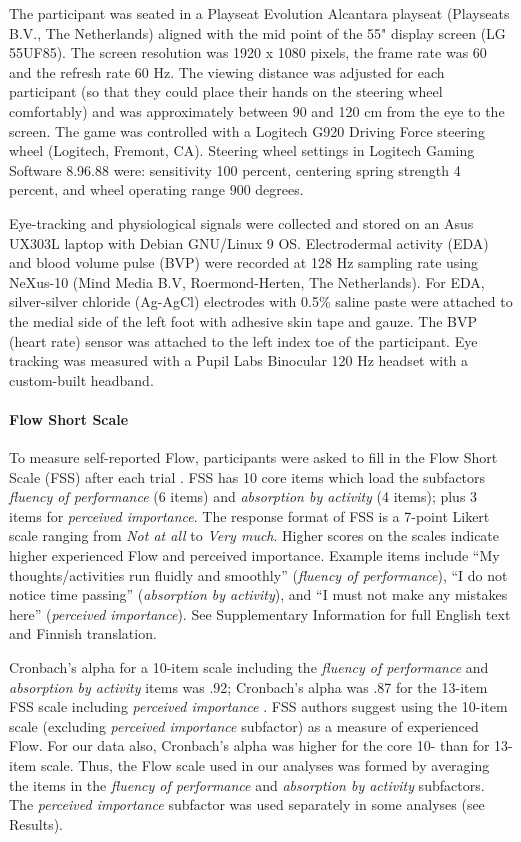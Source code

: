 \documentclass{frontierstyle/frontiersSCNS}
\newcommand{\hl}{\textcolor{red!80}}
\begin{document}
The participant was seated in a Playseat Evolution Alcantara playseat (Playseats B.V., The Netherlands) aligned with the mid point of the 55" display screen (LG 55UF85). The screen resolution was 1920 x 1080 pixels, the frame rate was 60 and the refresh rate 60 Hz. The viewing distance was adjusted for each participant (so that they could place their hands on the steering wheel comfortably) and was approximately between 90 and 120 cm from the eye to the screen. The game was controlled with a Logitech G920 Driving Force steering wheel (Logitech, Fremont, CA). Steering wheel settings in Logitech Gaming Software 8.96.88 were: sensitivity 100 percent, centering spring strength 4 percent, and wheel operating range 900 degrees.

Eye-tracking and physiological signals were collected and stored on an Asus UX303L laptop with Debian GNU/Linux 9 OS. \hl{Electrodermal activity (EDA) and blood volume pulse (BVP) were recorded at 128 Hz sampling rate using NeXus-10 (Mind Media B.V, Roermond-Herten, The Netherlands). For EDA, silver-silver chloride (Ag-AgCl) electrodes with 0.5\% saline paste were attached to the medial side of the left foot with adhesive skin tape and gauze. The BVP (heart rate) sensor was attached to the left index toe of the participant. Eye tracking was measured with a Pupil Labs Binocular 120 Hz headset with a custom-built headband.}


\paragraph*{Flow Short Scale} To measure self-reported Flow, participants were asked to fill in the Flow Short Scale (FSS) after each trial \citep{Rheinberg2003,Engeser2008}. FSS has 10 core items which load the subfactors {\it fluency of performance} (6 items) and {\it absorption by activity} (4 items); plus 3 items for {\it perceived importance}. The response format of FSS is a 7-point Likert scale ranging from {\it Not at all} to {\it Very much}. Higher scores on the scales indicate higher experienced Flow and perceived importance. Example items include ``My thoughts/activities run fluidly and smoothly'' ({\it fluency of performance}), ``I do not notice time passing'' ({\it absorption by activity}), and ``I must not make any mistakes here'' ({\it perceived importance}). See Supplementary Information for full English text and Finnish translation.

Cronbach's alpha for a 10-item scale including the {\it fluency of performance} and {\it absorption by activity} items was .92; Cronbach's alpha was .87 for the 13-item FSS scale including {\it perceived importance} \citep{Rheinberg2003}. FSS authors \citep{Rheinberg2003} suggest using the 10-item scale (excluding {\it perceived importance} subfactor) as a measure of experienced Flow. For our data also, Cronbach's alpha was higher for the core 10- than for 13-item scale. Thus, the Flow scale used in our analyses was formed by averaging the items in the {\it fluency of performance} and {\it absorption by activity} subfactors. The {\it perceived importance} subfactor was used separately in some analyses (see Results).
\end{document}
